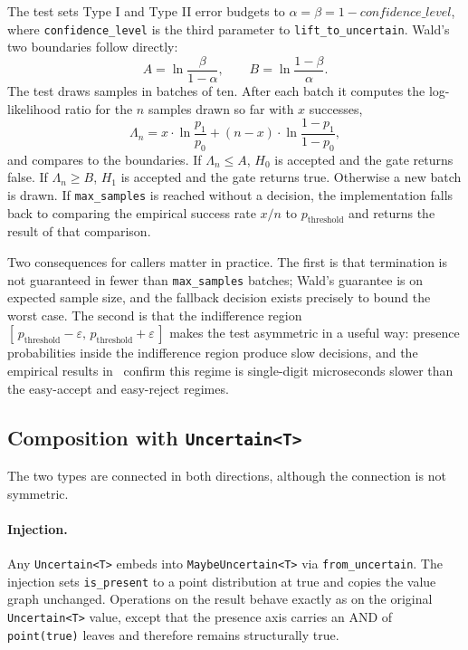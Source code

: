 The test sets Type I and Type II error budgets to
$\alpha = \beta = 1 - \mathit{confidence\_level}$, where
\texttt{confidence\_level} is the third parameter to
\texttt{lift\_to\_uncertain}. Wald's two boundaries follow directly:
$$
A = \ln \frac{\beta}{1 - \alpha}, \qquad
B = \ln \frac{1 - \beta}{\alpha}.
$$
The test draws samples in batches of ten. After each batch it computes the
log-likelihood ratio for the $n$ samples drawn so far with $x$ successes,
\begin{equation*}
\Lambda_n = x \cdot \ln \frac{p_1}{p_0}
          + (n - x) \cdot \ln \frac{1 - p_1}{1 - p_0},
\end{equation*}
and compares to the boundaries. If $\Lambda_n \le A$, $H_0$ is accepted and
the gate returns false. If $\Lambda_n \ge B$, $H_1$ is accepted and the gate
returns true. Otherwise a new batch is drawn. If \texttt{max\_samples} is
reached without a decision, the implementation falls back to comparing the
empirical success rate $x/n$ to $p_{\text{threshold}}$ and returns the result
of that comparison.

Two consequences for callers matter in practice. The first is that termination
is not guaranteed in fewer than \texttt{max\_samples} batches; Wald's
guarantee is on expected sample size, and the fallback decision exists
precisely to bound the worst case. The second is that the indifference
region $[\,p_{\text{threshold}} - \varepsilon,\, p_{\text{threshold}} + \varepsilon\,]$
makes the test asymmetric in a useful way: presence probabilities inside the
indifference region produce slow decisions, and the empirical results
in~ confirm this regime is single-digit microseconds
slower than the easy-accept and easy-reject regimes.

\subsection{Composition with \texttt{Uncertain<T>}}
\label{sec:semantics:composition}

The two types are connected in both directions, although the connection is
not symmetric.

\paragraph{Injection.} Any \texttt{Uncertain<T>} embeds into
\texttt{MaybeUncertain<T>} via \texttt{from\_uncertain}. The injection sets
\texttt{is\_present} to a point distribution at true and copies the value
graph unchanged. Operations on the result behave exactly as on the original
\texttt{Uncertain<T>} value, except that the presence axis carries an AND of
\texttt{point(true)} leaves and therefore remains structurally true.

